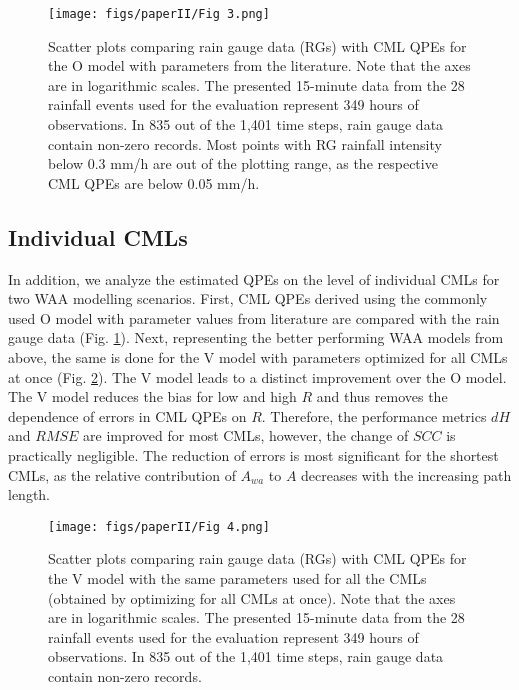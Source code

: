 \documentclass{ctuthesis}\usepackage[]{graphicx}\usepackage[]{color}
\begin{document}
\begin{figure}[h]
\begin{center}
\texttt{[image: figs/paperII/Fig 3.png]}
\caption{Scatter plots comparing rain gauge data (RGs) with CML QPEs for the O model with parameters from the literature. Note that the axes are in logarithmic scales. The presented 15-minute data from the 28 rainfall events used for the evaluation represent 349 hours of observations. In 835 out of the 1,401 time steps, rain gauge data contain non-zero records. Most points with RG rainfall intensity below 0.3 mm/h are out of the plotting range, as the respective CML QPEs are below 0.05 mm/h.} 
\label{fig:II_3}
\end{center}
\end{figure}



\subsection{Individual CMLs} \label{IIres2}

In addition, we analyze the estimated QPEs on the level of individual CMLs for two WAA modelling scenarios. First, CML QPEs derived using the commonly used O model with parameter values from literature are compared with the rain gauge data (Fig. \ref{fig:II_3}). Next, representing the better performing WAA models from above, the same is done for the V model with parameters optimized for all CMLs at once (Fig. \ref{fig:II_4}). The V model leads to a distinct improvement over the O model. The V model reduces the bias for low and high $R$ and thus removes the dependence of errors in CML QPEs on $R$. Therefore, the performance metrics $dH$ and $RMSE$ are improved for most CMLs, however, the change of $SCC$ is practically negligible. The reduction of errors is most significant for the shortest CMLs, as the relative contribution of $A_{wa}$ to $A$ decreases with the increasing path length.


\begin{figure}[h]
\begin{center}
\texttt{[image: figs/paperII/Fig 4.png]}
\caption{Scatter plots comparing rain gauge data (RGs) with CML QPEs for the V model with the same parameters used for all the CMLs (obtained by optimizing for all CMLs at once). Note that the axes are in logarithmic scales. The presented 15-minute data from the 28 rainfall events used for the evaluation represent 349 hours of observations. In 835 out of the 1,401 time steps, rain gauge data contain non-zero records.} 
\label{fig:II_4}
\end{center}
\end{figure}
\end{document}
